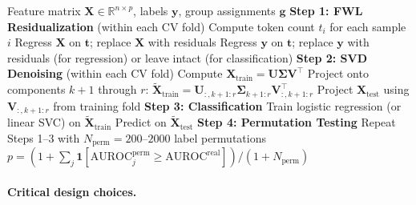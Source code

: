 \documentclass[11pt,a4paper]{article}
\begin{document}
\begin{algorithm}[H]
\caption{Canonical Denoising Pipeline}
\label{alg:canonical}
\begin{algorithmic}[1]
\Require Feature matrix $\mathbf{X} \in \mathbb{R}^{n \times p}$, labels $\mathbf{y}$, group assignments $\mathbf{g}$
\State \textbf{Step 1: FWL Residualization} (within each CV fold)
\State Compute token count $t_i$ for each sample $i$
\State Regress $\mathbf{X}$ on $\mathbf{t}$; replace $\mathbf{X}$ with residuals
\State Regress $\mathbf{y}$ on $\mathbf{t}$; replace $\mathbf{y}$ with residuals (for regression) or leave intact (for classification)
\State \textbf{Step 2: SVD Denoising} (within each CV fold)
\State Compute $\mathbf{X}_{\text{train}} = \mathbf{U}\boldsymbol{\Sigma}\mathbf{V}^\top$
\State Project onto components $k+1$ through $r$: $\tilde{\mathbf{X}}_{\text{train}} = \mathbf{U}_{:,k+1:r}\boldsymbol{\Sigma}_{k+1:r}\mathbf{V}_{:,k+1:r}^\top$
\State Project $\mathbf{X}_{\text{test}}$ using $\mathbf{V}_{:,k+1:r}$ from training fold
\State \textbf{Step 3: Classification}
\State Train logistic regression (or linear SVC) on $\tilde{\mathbf{X}}_{\text{train}}$
\State Predict on $\tilde{\mathbf{X}}_{\text{test}}$
\State \textbf{Step 4: Permutation Testing}
\State Repeat Steps 1--3 with $N_{\text{perm}} = 200$--$2000$ label permutations
\State $p = (1 + \sum_{j} \mathbf{1}[\text{AUROC}_j^{\text{perm}} \geq \text{AUROC}^{\text{real}}]) / (1 + N_{\text{perm}})$
\end{algorithmic}
\end{algorithm}

\paragraph{Critical design choices.}
\end{document}
